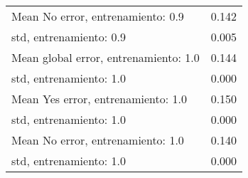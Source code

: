 \begin{longtable}{p{4cm}|p{1.5cm}}
Mean No error, entrenamiento: 0.9     &        0.142 \\
std, entrenamiento: 0.9               &        0.005 \\
Mean global error, entrenamiento: 1.0 &        0.144 \\
std, entrenamiento: 1.0               &        0.000 \\
Mean Yes error, entrenamiento: 1.0    &        0.150 \\
std, entrenamiento: 1.0               &        0.000 \\
Mean No error, entrenamiento: 1.0     &        0.140 \\
std, entrenamiento: 1.0               &        0.000 \\
\end{longtable}
